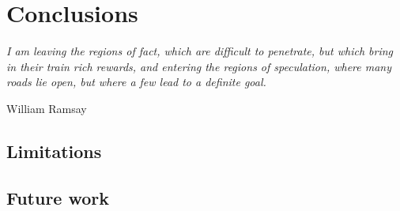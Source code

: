 \chapter{Conclusions}
\label{chapter:conclusions}

\epigraph{\textit{I am leaving the regions of fact, which are difficult to penetrate, but which bring in their train rich rewards, and entering the regions of speculation, where many roads lie open, but where a few lead to a definite goal.}}{William Ramsay}
\section{Limitations}

\section{Future work}
